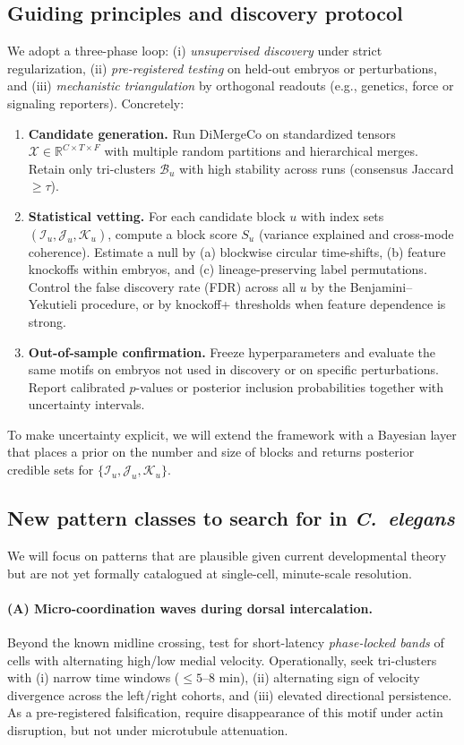 \documentclass[unnumsec,webpdf,modern,large,namedate]{oup-authoring-template}%
\theoremstyle{thmstyleone}\newtheorem{theorem}{Theorem}
\theoremstyle{thmstyletwo}\newtheorem{example}{Example}
\theoremstyle{thmstylethree}\newtheorem{definition}{Definition}
\begin{document}
\subsection{Guiding principles and discovery protocol}
We adopt a three-phase loop: (i) \emph{unsupervised discovery} under strict regularization,
(ii) \emph{pre-registered testing} on held-out embryos or perturbations, and
(iii) \emph{mechanistic triangulation} by orthogonal readouts (e.g., genetics, force or
signaling reporters).  Concretely:
\begin{enumerate}
  \item \textbf{Candidate generation.} Run DiMergeCo on standardized tensors
  $\mathcal{X}\in\mathbb{R}^{C\times T\times F}$ with multiple random partitions
  and hierarchical merges.  Retain only tri-clusters $\mathcal{B}_u$
  with high stability across runs (consensus Jaccard $\geq \tau$).
  \item \textbf{Statistical vetting.} For each candidate block $u$ with index sets
  $(\mathcal{I}_u,\mathcal{J}_u,\mathcal{K}_u)$, compute a block score $S_u$ (variance
  explained and cross-mode coherence).  Estimate a null by (a) blockwise circular
  time-shifts, (b) feature knockoffs within embryos, and (c) lineage-preserving
  label permutations.  Control the false discovery rate (FDR) across all $u$ by the
  Benjamini–Yekutieli procedure, or by knockoff+ thresholds when feature dependence is strong.
  \item \textbf{Out-of-sample confirmation.} Freeze hyperparameters and evaluate the same
  motifs on embryos not used in discovery or on specific perturbations.  Report calibrated
  $p$-values or posterior inclusion probabilities together with uncertainty intervals.
\end{enumerate}
To make uncertainty explicit, we will extend the framework with a Bayesian layer that
places a prior on the number and size of blocks and returns posterior credible sets for
$\{\mathcal{I}_u,\mathcal{J}_u,\mathcal{K}_u\}$.

\subsection{New pattern classes to search for in \textit{C.~elegans}}
We will focus on patterns that are plausible given current developmental theory but are
not yet formally catalogued at single-cell, minute-scale resolution.

\paragraph{(A) Micro-coordination waves during dorsal intercalation.}
Beyond the known midline crossing, test for short-latency \emph{phase-locked bands} of
cells with alternating high/low medial velocity.  Operationally, seek tri-clusters with
(i) narrow time windows ($\leq 5$--$8$ min), (ii) alternating sign of velocity divergence
across the left/right cohorts, and (iii) elevated directional persistence.  As a
pre-registered falsification, require disappearance of this motif under actin
disruption, but not under microtubule attenuation.
\end{document}
